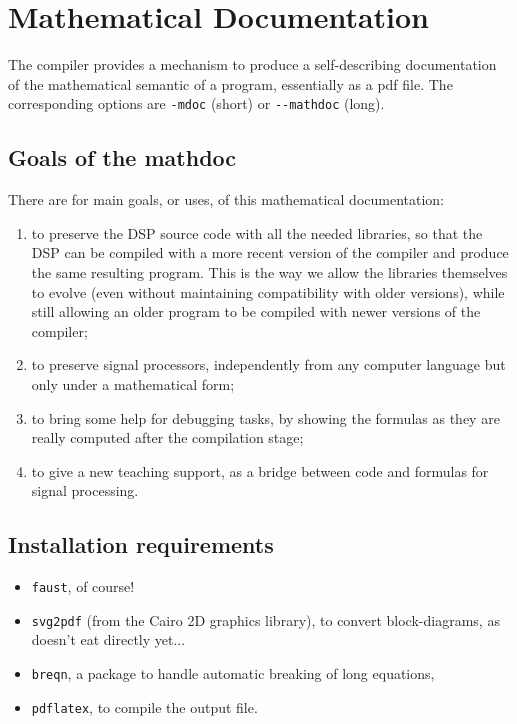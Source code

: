 \chapter{Mathematical Documentation}
\label{mdoc}

The \faust compiler provides a mechanism to produce a self-describing documentation of the mathematical semantic of a \faust program, essentially as a pdf file. The corresponding options are \lstinline!-mdoc! (short) or \lstinline!--mathdoc! (long).

\section{Goals of the mathdoc}
\label{goals-of-mdoc}

There are for main goals, or uses, of this mathematical documentation:
\begin{enumerate}
\item to preserve the DSP source code with all the needed libraries, so that the DSP can be compiled with a more recent version of the compiler and produce the same resulting program. This is the way we allow the libraries themselves to evolve (even without maintaining compatibility with older versions), while still allowing an older program to be compiled with newer versions of the compiler;
\item to preserve signal processors, independently from any computer language but only under a mathematical form;
\item to bring some help for debugging tasks, by showing the formulas as they are really computed after the compilation stage;
\item to give a new teaching support, as a bridge between code and formulas for signal processing.
\end{enumerate}

\section{Installation requirements}
\label{inst-requ}

\begin{itemize}
\item \lstinline!faust!, of course!
\item \lstinline!svg2pdf! (from the Cairo 2D graphics library), to convert block-diagrams, as \latex doesn't eat \svg directly yet...
\item \lstinline!breqn!, a \latex package to handle automatic breaking of long equations,
\item \lstinline!pdflatex!, to compile the \latex output file.
\end{itemize}


